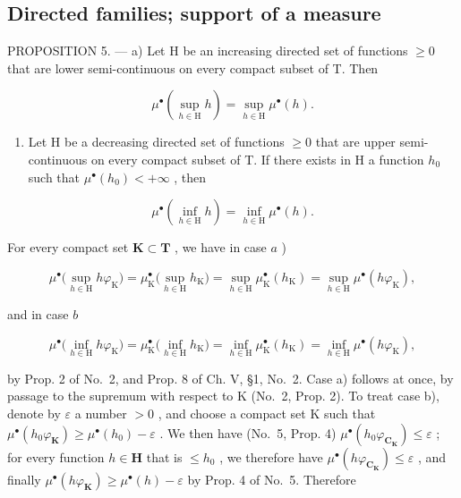 \subsection{Directed families; support of a measure}

PROPOSITION 5. --- a) Let H be an increasing directed set of functions \(\geqslant 0\) that are lower semi-continuous on every compact subset of T. Then

\[
\mu^ {\bullet} \left(\sup _ {h \in \mathrm{H}} h\right) = \sup _ {h \in \mathrm{H}} \mu^ {\bullet} (h).\tag{5}
\]

\begin{enumerate}
\def\labelenumi{\alph{enumi})}
\setcounter{enumi}{1}
\tightlist
\item
  Let H be a decreasing directed set of functions \(\geqslant0\) that are upper semi-continuous on every compact subset of T. If there exists in H a function \(h_{0}\) such that \(\mu^{\bullet}(h_{0})<+\infty\) , then
\end{enumerate}

\[
\mu^ {\bullet} \left(\inf _ {h \in \mathrm{H}} h\right) = \inf _ {h \in \mathrm{H}} \mu^ {\bullet} (h).\tag{6}
\]

For every compact set \(\mathbf{K} \subset \mathbf{T}\) , we have in case \(a\) )

\[
\mu^ {\bullet} \Big (\sup _ {h \in \mathrm{H}} h \varphi_ {\mathrm{K}} \Big) = \mu_ {\mathrm{K}} ^ {\bullet} \Big (\sup _ {h \in \mathrm{H}} h _ {\mathrm{K}} \Big) = \sup _ {h \in \mathrm{H}} \mu_ {\mathrm{K}} ^ {\bullet} (h _ {\mathrm{K}}) = \sup _ {h \in \mathrm{H}} \mu^ {\bullet} (h \varphi_ {\mathrm{K}}),
\]

and in case \(b\)

\[
\mu^ {\bullet} \Big (\inf _ {h \in \mathrm{H}} h \varphi_ {\mathrm{K}} \Big) = \mu_ {\mathrm{K}} ^ {\bullet} \Big (\inf _ {h \in \mathrm{H}} h _ {\mathrm{K}} \Big) = \inf _ {h \in \mathrm{H}} \mu_ {\mathrm{K}} ^ {\bullet} (h _ {\mathrm{K}}) = \inf _ {h \in \mathrm{H}} \mu^ {\bullet} (h \varphi_ {\mathrm{K}}),
\]

by Prop. 2 of No.~2, and Prop. 8 of Ch. V, §1, No.~2. Case a) follows at once, by passage to the supremum with respect to K (No.~2, Prop. 2). To treat case b), denote by \(\varepsilon\) a number \(>0\) , and choose a compact set K such that \(\mu^{\bullet}(h_0\varphi_{\mathbf{K}}) \geqslant \mu^{\bullet}(h_0) - \varepsilon\) . We then have (No.~5, Prop. 4) \(\mu^{\bullet}(h_0\varphi_{\mathbf{C}_{\mathbf{K}}}) \leqslant \varepsilon\) ; for every function \(h \in \mathbf{H}\) that is \(\leqslant h_0\) , we therefore have \(\mu^{\bullet}(h\varphi_{\mathbf{C}_{\mathbf{K}}}) \leqslant \varepsilon\) , and finally \(\mu^{\bullet}(h\varphi_{\mathbf{K}}) \geqslant \mu^{\bullet}(h) - \varepsilon\) by Prop. 4 of No.~5. Therefore

